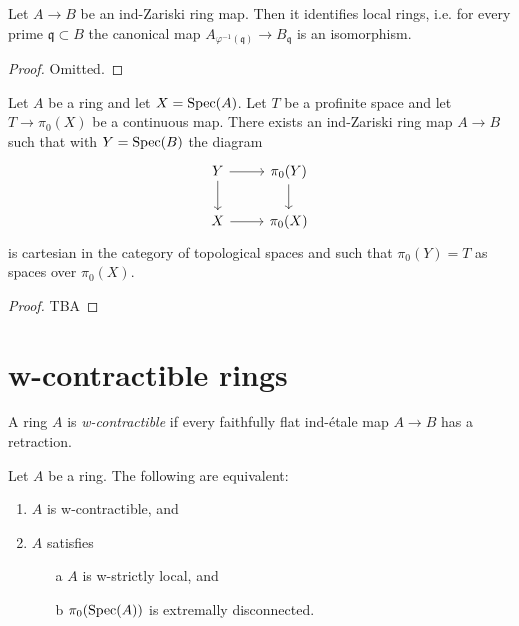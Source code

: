 \begin{lemma}
  Let $A \to B$ be an ind-Zariski ring map. Then it identifies local rings, i.e. for every prime $\mathfrak{q} \subset B$ the canonical map $A_{\varphi^{-1}(\mathfrak{q})} \to B_{\mathfrak{q}}$ is an isomorphism.
  \label{ind-Zariski-identifies-local-rings}
\end{lemma}

\begin{proof}
  Omitted.
\end{proof}

\begin{lemma}
Let $A$ be a ring and let $X = \operatorname{Spec} (A)$. Let $T$ be a profinite space and let $T \to \pi_0(X)$ be a continuous map. There exists an ind-Zariski ring map $A \to B$ such that with $Y = \operatorname{Spec} (B)$ the diagram
\[
\begin{tikzcd}
Y \arrow[r] \arrow[d] & \pi_0(Y) \arrow[d] \\
X \arrow[r] & \pi_0(X)
\end{tikzcd}
\]
is cartesian in the category of topological spaces and such that $\pi_0(Y) = T$ as spaces over $\pi_0(X)$.
\label{exists-ind-zariski-cartesian}
\end{lemma}

\begin{proof}
  TBA
\end{proof}

\section{w-contractible rings}

\begin{definition}
A ring \(A\) is \emph{w-contractible} if every faithfully flat ind-\'etale map \(A \to B\) has a retraction.
  \label{def:w-contractible-ring}
\end{definition}

\begin{lemma}
\label{thm:w-contractible-iff}

Let $A$ be a ring. The following are equivalent:
\begin{enumerate}
    \item $A$ is w-contractible, and
    \item $A$ satisfies
    \begin{enumerate}
        \item[a] $A$ is w-strictly local, and
        \item[b] $\pi_0(\operatorname{Spec} (A))$ is extremally disconnected.
    \end{enumerate}
\end{enumerate}
\end{lemma}

